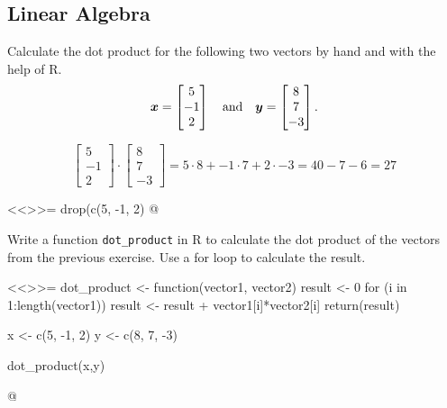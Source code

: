 \documentclass
[answers]
{exercise_sheet}
\begin{document}
\subsection*{Linear Algebra}

\begin{Question}{2}
Calculate the dot product for the following two vectors by hand and with the help of R.
\begin{equation*}
\bm{x} = 
\begin{bmatrix} 
5 \\ -1 \\ 2 
\end{bmatrix}
\quad
\text{and}
\quad
\bm{y} = 
\begin{bmatrix} 
8 \\ 7 \\ -3 
\end{bmatrix}
.
\end{equation*}
\end{Question}

\makeatletter\if@answers\begin{Answer}{5}
\begin{equation*}
\begin{bmatrix} 
5 \\ -1 \\ 2 
\end{bmatrix}
\cdot 
\begin{bmatrix} 
8 \\ 7 \\ -3 
\end{bmatrix} 
= 5 \cdot 8 + -1 \cdot 7 + 2 \cdot -3 
= 40 - 7 - 6 
= 27 
\end{equation*}
\end{Answer}

<<>>=
drop(c(5, -1, 2) %
@
\fi\makeatother

\begin{Question}{2}
Write a function \verb|dot_product| in R to calculate the dot product of the vectors from the previous exercise. Use a for loop to calculate the result.
\end{Question}

\makeatletter\if@answers\begin{Answer}{12}

<<>>=
dot_product <- function(vector1, vector2) {
  result <- 0
  for (i in 1:length(vector1)) {
    result <- result + vector1[i]*vector2[i]
  }
  return(result)
}

x <- c(5, -1, 2)
y <- c(8, 7, -3)

dot_product(x,y)

@
\end{Answer}\fi\makeatother
\end{document}
